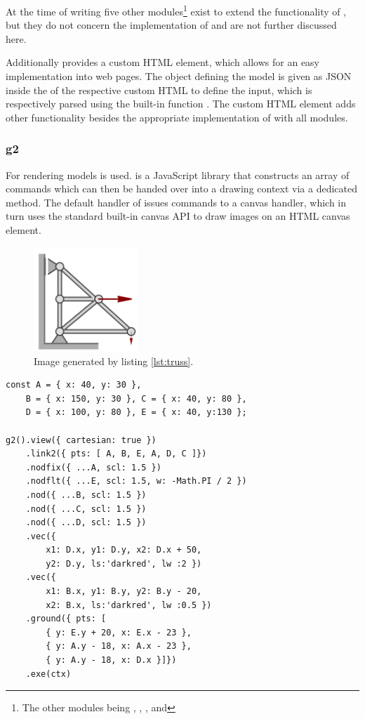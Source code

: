 At the time of writing five other modules\footnote{The other modules being , , ,  and } %
exist to extend the functionality of , but they do not concern the implementation of  and are not further discussed here.

Additionally  provides a custom HTML element, which allows for an easy implementation into web pages.
The object defining the model is given as JSON inside the  of the respective custom HTML to define the input, which is respectively parsed using the built-in function . %
The custom HTML element adds other functionality besides the appropriate implementation of  with all modules.

\subsubsection{g2}

For rendering models  is used. %
 is a JavaScript library that constructs an array of commands which can then be handed over into a drawing context via a dedicated  method.
The default handler of  issues commands to a canvas handler, which in turn uses the standard built-in canvas API to draw images on an HTML canvas element.

\begin{figure}
    \centering
    \includegraphics[width=0.35\textwidth]{images/truss.png}
    \caption{Image generated by listing \ref{lst:truss}.}
    \label{fig:truss}
\end{figure}

\begin{lstlisting}[label={lst:truss}, caption={Example code of a truss defined with g2.}]
const A = { x: 40, y: 30 },
    B = { x: 150, y: 30 }, C = { x: 40, y: 80 },
    D = { x: 100, y: 80 }, E = { x: 40, y:130 };

g2().view({ cartesian: true })
    .link2({ pts: [ A, B, E, A, D, C ]})
    .nodfix({ ...A, scl: 1.5 })
    .nodflt({ ...E, scl: 1.5, w: -Math.PI / 2 })
    .nod({ ...B, scl: 1.5 })
    .nod({ ...C, scl: 1.5 })
    .nod({ ...D, scl: 1.5 })
    .vec({
        x1: D.x, y1: D.y, x2: D.x + 50,
        y2: D.y, ls:'darkred', lw :2 })
    .vec({
        x1: B.x, y1: B.y, y2: B.y - 20,
        x2: B.x, ls:'darkred', lw :0.5 })
    .ground({ pts: [
        { y: E.y + 20, x: E.x - 23 },
        { y: A.y - 18, x: A.x - 23 },
        { y: A.y - 18, x: D.x }]})
    .exe(ctx)
\end{lstlisting}

